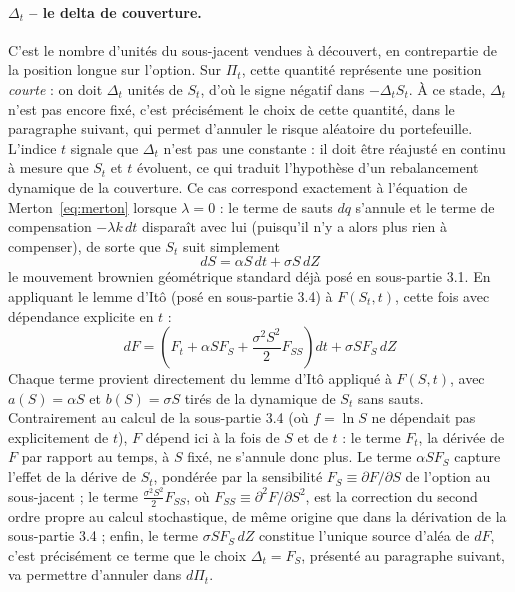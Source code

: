 \documentclass{article}
\begin{document}
\paragraph{$\Delta_t$ -- le delta de couverture.} C'est le nombre d'unités du sous-jacent vendues à découvert, en contrepartie de la position longue sur l'option. Sur $\Pi_t$, cette quantité représente une position \emph{courte} : on doit $\Delta_t$ unités de $S_t$, d'où le signe négatif dans $-\Delta_t S_t$. À ce stade, $\Delta_t$ n'est pas encore fixé, c'est précisément le choix de cette quantité, dans le paragraphe suivant, qui permet d'annuler le risque aléatoire du portefeuille. L'indice $t$ signale que $\Delta_t$ n'est pas une constante : il doit être réajusté en continu à mesure que $S_t$ et $t$ évoluent, ce qui traduit l'hypothèse d'un rebalancement dynamique de la couverture.
Ce cas correspond exactement à l'équation de Merton~\eqref{eq:merton} lorsque $\lambda=0$ : le terme de sauts $dq$ s'annule et le terme de compensation $-\lambda k\,dt$ disparaît avec lui (puisqu'il n'y a alors plus rien à compenser), de sorte que $S_t$ suit simplement
\begin{equation}
dS = \alpha S\, dt + \sigma S\, dZ
\end{equation}
le mouvement brownien géométrique standard déjà posé en sous-partie 3.1. En appliquant le lemme d'Itô (posé en sous-partie 3.4) à $F(S_t,t)$, cette fois avec dépendance explicite en $t$ :
\begin{equation}
dF = \left(F_t + \alpha S F_S + \frac{\sigma^2 S^2}{2} F_{SS}\right) dt + \sigma S F_S\, dZ
\end{equation}
Chaque terme provient directement du lemme d'Itô appliqué à $F(S,t)$, avec $a(S)=\alpha S$ et $b(S)=\sigma S$ tirés de la dynamique de $S_t$ sans sauts. Contrairement au calcul de la sous-partie 3.4 (où $f=\ln S$ ne dépendait pas explicitement de $t$), $F$ dépend ici à la fois de $S$ et de $t$ : le terme $F_t$, la dérivée de $F$ par rapport au temps, à $S$ fixé, ne s'annule donc plus. Le terme $\alpha S F_S$ capture l'effet de la dérive de $S_t$, pondérée par la sensibilité $F_S \equiv \partial F/\partial S$ de l'option au sous-jacent ; le terme $\frac{\sigma^2 S^2}{2}F_{SS}$, où $F_{SS}\equiv \partial^2 F/\partial S^2$, est la correction du second ordre propre au calcul stochastique, de même origine que dans la dérivation de la sous-partie 3.4 ; enfin, le terme $\sigma S F_S\,dZ$ constitue l'unique source d'aléa de $dF$, c'est précisément ce terme que le choix $\Delta_t=F_S$, présenté au paragraphe suivant, va permettre d'annuler dans $d\Pi_t$.
\end{document}
